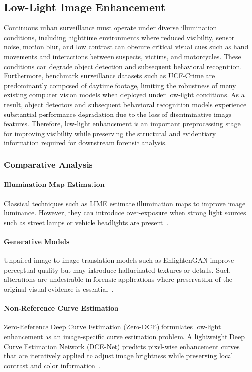 \documentclass[runningheads]{llncs}
\begin{document}
\subsection{Low-Light Image Enhancement}

Continuous urban surveillance must operate under diverse illumination conditions, including nighttime environments where reduced visibility, sensor noise, motion blur, and low contrast can obscure critical visual cues such as hand movements and interactions between suspects, victims, and motorcycles. These conditions can degrade object detection and subsequent behavioral recognition. Furthermore, benchmark surveillance datasets such as UCF-Crime are predominantly composed of daytime footage, limiting the robustness of many existing computer vision models when deployed under low-light conditions. As a result, object detectors and subsequent behavioral recognition models experience substantial performance degradation due to the loss of discriminative image features. Therefore, low-light enhancement is an important preprocessing stage for improving visibility while preserving the structural and evidentiary information required for downstream forensic analysis.

\subsubsection{Comparative Analysis}

\paragraph{Illumination Map Estimation}
Classical techniques such as LIME estimate illumination maps to improve image luminance. However, they can introduce over-exposure when strong light sources such as street lamps or vehicle headlights are present~\cite{lime}.

\paragraph{Generative Models}
Unpaired image-to-image translation models such as EnlightenGAN improve perceptual quality but may introduce hallucinated textures or details. Such alterations are undesirable in forensic applications where preservation of the original visual evidence is essential~\cite{enlightengan}.

\paragraph{Non-Reference Curve Estimation}
Zero-Reference Deep Curve Estimation (Zero-DCE) formulates low-light enhancement as an image-specific curve estimation problem. A lightweight Deep Curve Estimation Network (DCE-Net) predicts pixel-wise enhancement curves that are iteratively applied to adjust image brightness while preserving local contrast and color information~\cite{zerodce}.
\end{document}

